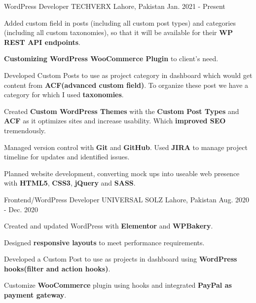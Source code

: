

\begin{cventries}

  \cventry
    {WordPress Developer} %
    {TECHVERX} %
    {Lahore, Pakistan} %
    {Jan. 2021 - Present} %
    {
      \begin{cvitems} %
        \item {Added custom field in posts (including all custom post types) and categories (including all custom taxonomies), so that it will be available for their \textbf{WP REST API endpoints}.}
        \item {\textbf{Customizing WordPress WooCommerce Plugin} to client's need.}
        \item {Developed Custom Posts to use as project category in dashboard which would get content from \textbf{ACF(advanced custom field)}. To organize these post we have a category for which I used \textbf{taxonomies}.}
        \item {Created \textbf{Custom WordPress Themes} with the \textbf{Custom Post Types} and \textbf{ACF} as it optimizes sites and increase usability. Which \textbf{improved SEO} tremendously.}
        \item {Managed version control with \textbf{Git} and \textbf{GitHub}. Used \textbf{JIRA} to manage project timeline for updates and identified issues.}
        \item {Planned website development, converting mock ups into useable web presence with \textbf{HTML5}, \textbf{CSS3}, \textbf{jQuery} and \textbf{SASS}.}
      \end{cvitems}
    }

  \cventry
    {Frontend/WordPress Developer} %
    {UNIVERSAL SOLZ} %
    {Lahore, Pakistan} %
    {Aug. 2020 - Dec. 2020} %
    {
      \begin{cvitems} %
        \item {Created and updated WordPress with \textbf{Elementor} and \textbf{WPBakery}.}
        \item {Designed \textbf{responsive layouts} to meet performance requirements.}
        \item {Developed a Custom Post to use as projects in dashboard using \textbf{WordPress hooks(filter and action hooks)}.}
        \item {Customize \textbf{WooCommerce} plugin using hooks and integrated \textbf{PayPal as payment gateway}.}
      \end{cvitems}
    }


\end{cventries}
